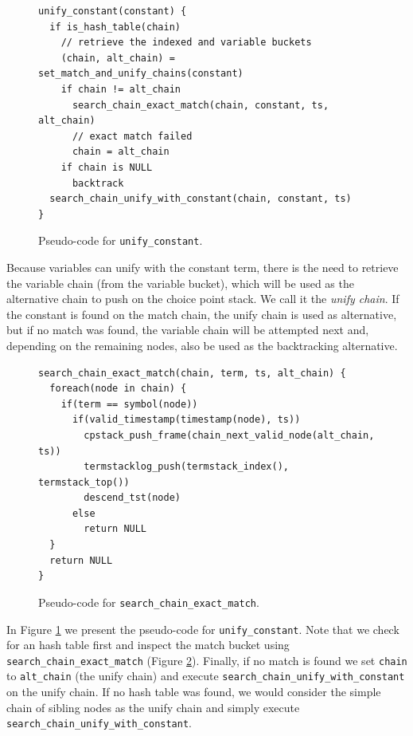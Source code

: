 \begin{figure}[H]
\begin{Verbatim}[fontsize=\small]
unify_constant(constant) {
  if is_hash_table(chain)
    // retrieve the indexed and variable buckets
    (chain, alt_chain) = set_match_and_unify_chains(constant)
    if chain != alt_chain
      search_chain_exact_match(chain, constant, ts, alt_chain)
      // exact match failed
      chain = alt_chain
    if chain is NULL
      backtrack
  search_chain_unify_with_constant(chain, constant, ts)
}
\end{Verbatim}
\caption{Pseudo-code for \texttt{unify\_constant}.}
\label{fig:unify_constant}
\end{figure}

Because variables can unify with the constant term, there is the need to retrieve the variable chain (from the variable bucket), which will be used as the alternative chain to push on the choice point stack. We call it the \textit{unify chain}. If the constant is found on the match chain, the unify chain is used as alternative, but if no match was found, the variable chain will be attempted next and, depending on the remaining nodes, also be used as the backtracking alternative.

\begin{figure}[H]
\begin{Verbatim}[fontsize=\small]
search_chain_exact_match(chain, term, ts, alt_chain) {
  foreach(node in chain) {
    if(term == symbol(node))
      if(valid_timestamp(timestamp(node), ts))
        cpstack_push_frame(chain_next_valid_node(alt_chain, ts))
        termstacklog_push(termstack_index(), termstack_top())
        descend_tst(node)
      else
        return NULL
  }
  return NULL
}
\end{Verbatim}
\caption{Pseudo-code for \texttt{search\_chain\_exact\_match}.}
\label{fig:search_chain_exact_match}
\end{figure}

In Figure \ref{fig:unify_constant} we present the pseudo-code for \texttt{unify\_constant}. Note that we check for an hash table first and inspect the match bucket using \texttt{search\_chain\_exact\_match} (Figure \ref{fig:search_chain_exact_match}).
Finally, if no match is found we set \texttt{chain} to \texttt{alt\_chain} (the unify chain) and execute \texttt{search\_chain\_unify\_with\_constant} on the unify chain. If no hash table was found, we would consider the simple chain of sibling nodes as the unify chain and simply execute \texttt{search\_chain\_unify\_with\_constant}.

